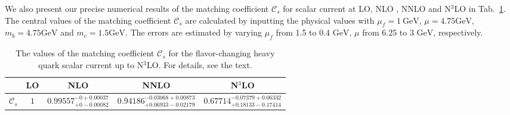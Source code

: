 \documentclass[onecolumn,preprintnumbers,aps,superscriptaddress,nofootinbib,prd,notitlepage]{revtex4-1}
\begin{document}
{\begin{figure}[thb]
\end{figure}

We also present our precise numerical results of the matching coefficient $\mathcal{C}_s$ for scalar current at LO,  NLO ,  NNLO and N$^3$LO in Tab.~\ref{tab:Csnum}.
The central values of  the matching coefficient $\mathcal{C}_s$ are calculated by inputting the  physical values with $\mu_f=1~\mathrm{GeV}$, $\mu=4.75\mathrm{GeV}$, $m_b=4.75\mathrm{GeV}$ and $m_c=1.5\mathrm{GeV}$.
The errors are estimated by varying $\mu_f$  from  1.5 to 0.4 $\mathrm{GeV}$, $\mu$  from   6.25 to 3 $\mathrm{GeV}$, respectively.

\begin{table}[thb]
\caption{The values of the matching coefficient $\mathcal{C}_s$ for the flavor-changing heavy quark  scalar  current up to N$^3$LO. For details, see the text.  \label{tab:Csnum}}
\renewcommand\arraystretch{2} 		\tabcolsep=0.2cm
		\begin{tabular}{ c c c c c}\hline\hline
			& LO         &  NLO                   & NNLO     & N$^3$LO			\\\hline
			$\mathcal{C}_s$	 & $1$ & $0.99557^{-0+0.00037}_{+0-0.00082}$   &    $0.94186^{-0.03068+0.00873}_{+0.06933-0.02179}$  &     $0.67714^{-0.07379+0.06332}_{+0.18133-0.17414}$			\\		\hline \hline
\end{tabular}\end{table}

}
\end{document}
